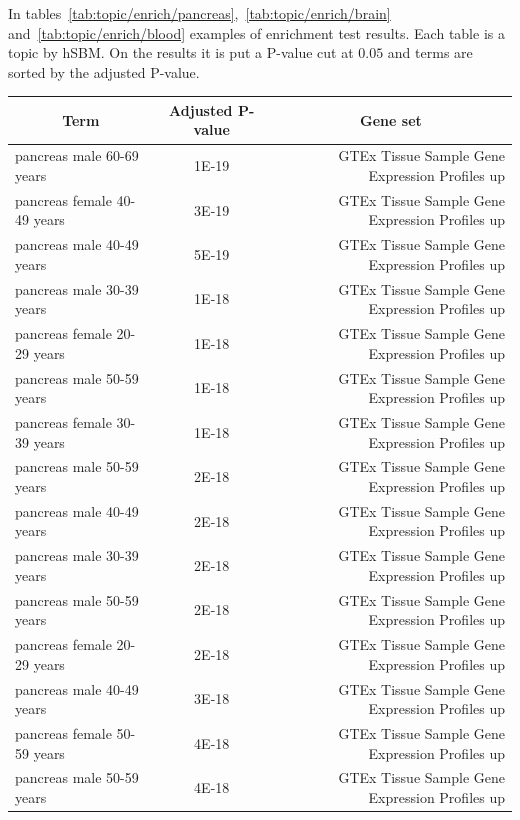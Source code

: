 In tables~\ref{tab:topic/enrich/pancreas},~\ref{tab:topic/enrich/brain} and~\ref{tab:topic/enrich/blood} examples of enrichment test results. Each table is a topic by hSBM. On the results it is put a P-value cut at $0.05$ and terms are sorted by the adjusted P-value.
\begin{table}[htb!]
	\tiny
	\begin{center}
		\begin{tabular}{|l|c|r|}
			\hline
			 \multicolumn{1}{|c}{Term} & \multicolumn{1}{|c|}{Adjusted P-value} & \multicolumn{1}{c|}{Gene set} \\ \hline
			pancreas male 60-69 years & 1E-19 & GTEx Tissue Sample Gene Expression Profiles up \\ \hline
			pancreas female 40-49 years & 3E-19 & GTEx Tissue Sample Gene Expression Profiles up \\ \hline
			pancreas male 40-49 years & 5E-19 & GTEx Tissue Sample Gene Expression Profiles up \\ \hline
			pancreas male 30-39 years & 1E-18 & GTEx Tissue Sample Gene Expression Profiles up \\ \hline
			pancreas female 20-29 years & 1E-18 & GTEx Tissue Sample Gene Expression Profiles up \\ \hline
			pancreas male 50-59 years & 1E-18 & GTEx Tissue Sample Gene Expression Profiles up \\ \hline
			pancreas female 30-39 years & 1E-18 & GTEx Tissue Sample Gene Expression Profiles up \\ \hline
			pancreas male 50-59 years & 2E-18 & GTEx Tissue Sample Gene Expression Profiles up \\ \hline
			pancreas male 40-49 years & 2E-18 & GTEx Tissue Sample Gene Expression Profiles up \\ \hline
			pancreas male 30-39 years & 2E-18 & GTEx Tissue Sample Gene Expression Profiles up \\ \hline
			pancreas male 50-59 years & 2E-18 & GTEx Tissue Sample Gene Expression Profiles up \\ \hline
			pancreas female 20-29 years & 2E-18 & GTEx Tissue Sample Gene Expression Profiles up \\ \hline
			pancreas male 40-49 years & 3E-18 & GTEx Tissue Sample Gene Expression Profiles up \\ \hline
			pancreas female 50-59 years & 4E-18 & GTEx Tissue Sample Gene Expression Profiles up \\ \hline
			pancreas male 50-59 years & 4E-18 & GTEx Tissue Sample Gene Expression Profiles up \\ \hline

\end{tabular}
\end{center}
\end{table}
